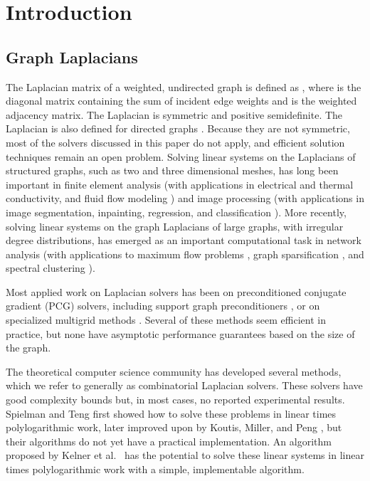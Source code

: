 \documentclass{sig-alternate}
\begin{document}
\section{Introduction}
\subsection{Graph Laplacians}
The Laplacian matrix of a weighted, undirected graph is defined as ,
where  is the diagonal matrix containing the sum of
incident edge weights and
 is the weighted adjacency matrix. The Laplacian is symmetric and positive
semidefinite. The Laplacian is also defined for directed graphs
\cite{AgaevChebotarev2005}. Because they are not symmetric,
most of the solvers discussed
in this paper do not apply, and efficient solution techniques remain
an open problem.
Solving linear systems on the Laplacians of structured graphs,
such as two and three dimensional meshes, has long been important in
finite element analysis (with applications in electrical and thermal
conductivity, and fluid flow modeling \cite{BHV2008})
and image processing (with applications in image segmentation,
inpainting, regression, and classification
\cite{KMT2011,McCannPollard2008,Grady2006}).
More recently,
solving linear systems on the graph Laplacians of
large graphs, with irregular degree distributions,
has emerged as an important computational task in network analysis
(with applications to maximum flow problems \cite{CKMST2011},
graph sparsification \cite{SpielmanSrivastava2011},
and spectral clustering \cite{KhoaChawla2015}).

Most applied work on Laplacian solvers has been on
preconditioned conjugate gradient (PCG) solvers, including support graph
preconditioners \cite{GrembanPHD1996,BGHNT2006,BCHT2004},
or on specialized multigrid
methods \cite{LivneBrandt2012,KMT2011}.
Several of these methods seem efficient in practice, but
none have asymptotic performance guarantees based on the size
of the graph.

The theoretical computer science community has developed several methods,
which we refer to generally as combinatorial Laplacian solvers.
These solvers have good complexity bounds but, in most cases,
no reported experimental results.
Spielman and Teng
\cite{SpielmanTeng2004} first showed
how to solve these problems in
linear times polylogarithmic work, later
improved upon by Koutis, Miller, and Peng \cite{KMP2010},
but their algorithms
do not yet have a practical implementation.
An algorithm proposed by Kelner et al.\ \cite{KOSZ2013}
has the potential to solve these linear
systems in linear times polylogarithmic
work with a simple, implementable algorithm.
\end{document}
